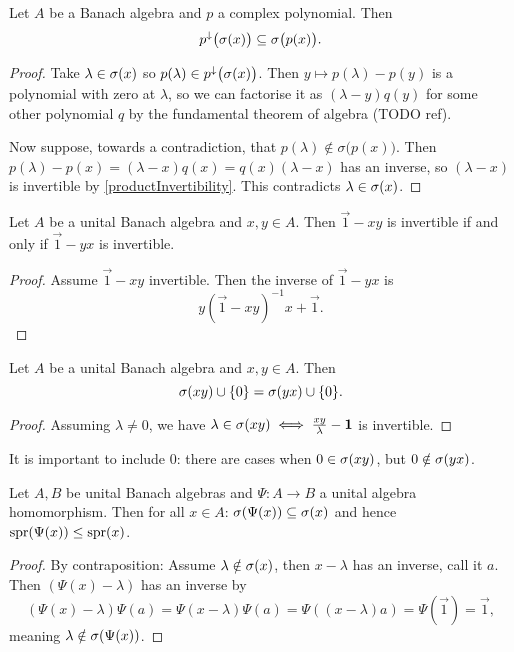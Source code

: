 \begin{lemma} \label{polynomialSpectralMapping}
Let $A$ be a Banach algebra and $p$ a complex polynomial. Then
\[ p^{\downarrow}\big(\sigma(x)\big) \subseteq \sigma\big(p(x)\big). \]
\end{lemma}
\begin{proof}
Take $\lambda\in\sigma(x)$ so $p(\lambda)\in p^{\downarrow}\big(\sigma(x)\big)$. Then $y\mapsto p(\lambda)-p(y)$ is a polynomial with zero at $\lambda$, so we can factorise it as $(\lambda - y)q(y)$ for some other polynomial $q$ by the fundamental theorem of algebra (TODO ref).

Now suppose, towards a contradiction, that $p(\lambda)\notin \sigma\big(p(x)\big)$. Then $p(\lambda) - p(x) = (\lambda - x)q(x) = q(x)(\lambda - x)$ has an inverse, so $(\lambda - x)$ is invertible by \ref{productInvertibility}. This contradicts $\lambda\in\sigma(x)$.
\end{proof}

\begin{proposition}
Let $A$ be a unital Banach algebra and $x,y\in A$. Then $\vec{1} - xy$ is invertible \textup{if and only if} $\vec{1} - yx$ is invertible.
\end{proposition}
\begin{proof}
Assume $\vec{1} - xy$ invertible. Then the inverse of $\vec{1} - yx$ is
\[ y(\vec{1} - xy)^{-1}x + \vec{1}. \]
\end{proof}
\begin{corollary}
Let $A$ be a unital Banach algebra and $x,y\in A$. Then
\[ \sigma(xy)\cup\{0\} = \sigma(yx)\cup\{0\}. \]
\end{corollary}
\begin{proof}
Assuming $\lambda \neq 0$, we have $\lambda\in\sigma(xy) \iff \frac{xy}{\lambda} - \boldsymbol{\mathrm{1}}$ is invertible.
\end{proof}
It is important to include $0$: there are cases when $0\in \sigma(xy)$, but $0\notin \sigma(yx)$.

\begin{lemma} \label{spectrumOfImage}
Let $A,B$ be unital Banach algebras and $\Psi: A\to B$ a unital algebra homomorphism. Then for all $x\in A$: $\sigma(\Psi(x)) \subseteq \sigma(x)$ and hence $\operatorname{spr}(\Psi(x)) \leq \operatorname{spr}(x)$.
\end{lemma}
\begin{proof}
By contraposition: Assume $\lambda\notin\sigma(x)$, then $x-\lambda$ has an inverse, call it $a$. Then $(\Psi(x) - \lambda)$ has an inverse by
\[ (\Psi(x) - \lambda)\Psi(a) = \Psi(x-\lambda)\Psi(a) = \Psi((x-\lambda)a) = \Psi(\vec{1}) = \vec{1},\]
meaning $\lambda \notin \sigma(\Psi(x))$.
\end{proof}

